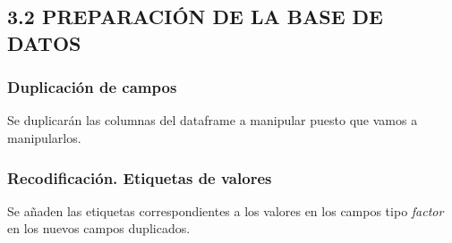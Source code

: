 \documentclass[
  12 pt,
  a4paper,
]{article}
\newenvironment{Shaded}{\begin{snugshade}}{\end{snugshade}}
\newcommand{\NormalTok}[1]{#1}
\newcommand{\OtherTok}[1]{\textcolor[rgb]{0.56,0.35,0.01}{#1}}
\newcommand{\SpecialCharTok}[1]{\textcolor[rgb]{0.81,0.36,0.00}{\textbf{#1}}}
\begin{document}
\subsection{3.2 PREPARACIÓN DE LA BASE DE
DATOS}\label{preparaciuxf3n-de-la-base-de-datos-1}

\subsubsection{Duplicación de campos}\label{duplicaciuxf3n-de-campos}

Se duplicarán las columnas del dataframe a manipular puesto que vamos a
manipularlos.

\begin{Shaded}
\end{Shaded}

\subsubsection{Recodificación. Etiquetas de
valores}\label{recodificaciuxf3n.-etiquetas-de-valores}

Se añaden las etiquetas correspondientes a los valores en los campos
tipo \emph{factor} en los nuevos campos duplicados.
\end{document}
